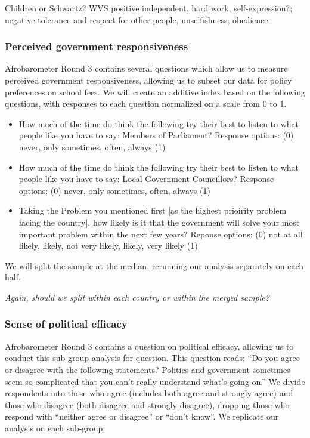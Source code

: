 \documentclass[]{article}
\begin{document}
Children or Schwartz? WVS positive independent, hard work,
self-expression?; negative tolerance and respect for other people,
unselfishness, obedience

\subsubsection{Perceived government
responsiveness}\label{perceived-government-responsiveness}

Afrobarometer Round 3 contains several questions which allow us to
measure perceived government responsiveness, allowing us to subset our
data for policy preferences on school fees. We will create an additive
index based on the following questions, with responses to each question
normalized on a scale from 0 to 1.

\begin{itemize}
  \item How much of the time do think the following try their best to listen to what people like you have to say: Members of Parliament? Response options: (0) never, only sometimes, often, always (1)
  \item How much of the time do think the following try their best to listen to what people like you have to say: Local Government Councillors? Response options: (0) never, only sometimes, often, always (1)
  \item Taking the Problem you mentioned first [as the highest prioirity problem facing the country], how likely is it that the government will solve your most important problem within the next few years? Reponse options: (0) not at all likely, likely, not very likely, likely, very likely (1)
\end{itemize}

We will split the sample at the median, rerunning our analysis
separately on each half.

\textit{Again, should we split within each country or within the merged sample?}

\subsubsection{Sense of political
efficacy}\label{sense-of-political-efficacy}

Afrobarometer Round 3 contains a question on political efficacy,
allowing us to conduct this sub-group analysis for question. This
question reads: ``Do you agree or disagree with the following
statements? Politics and government sometimes seem so complicated that
you can't really understand what's going on.'' We divide respondents
into those who agree (includes both agree and strongly agree) and those
who disagree (both disagree and strongly disagree), dropping those who
respond with ``neither agree or disagree'' or ``don't know''. We
replicate our analysis on each sub-group.
\end{document}
